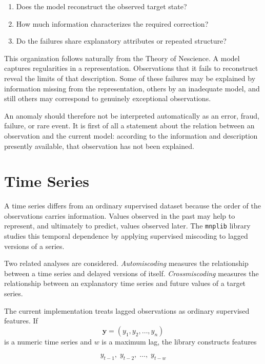 \begin{enumerate}
    \item Does the model reconstruct the observed target state?
    \item How much information characterizes the required correction?
    \item Do the failures share explanatory attributes or repeated structure?
\end{enumerate}

This organization follows naturally from the Theory of Nescience. A model
captures regularities in a representation. Observations that it fails to
reconstruct reveal the limits of that description. Some of these failures may
be explained by information missing from the representation, others by an
inadequate model, and still others may correspond to genuinely exceptional
observations.

An anomaly should therefore not be interpreted automatically as an error,
fraud, failure, or rare event. It is first of all a statement about the relation
between an observation and the current model: according to the information and
description presently available, that observation has not been explained.

%
%

\section{Time Series}
\label{sec:machine_learning_timeseries}

A time series differs from an ordinary supervised dataset because the order of
the observations carries information. Values observed in the past may help to
represent, and ultimately to predict, values observed later. The
\texttt{mnplib} library studies this temporal dependence by applying supervised
miscoding to lagged versions of a series.

Two related analyses are considered. \emph{Automiscoding} measures the
relationship between a time series and delayed versions of itself.
\emph{Crossmiscoding} measures the relationship between an explanatory time
series and future values of a target series.

The current implementation treats lagged observations as ordinary supervised
features. If
\[
\mathbf{y}
=
(y_1,y_2,\ldots,y_n)
\]
is a numeric time series and \(w\) is a maximum lag, the library constructs
features

\[
y_{t-1},\;
y_{t-2},\;
\ldots,\;
y_{t-w}
\]

